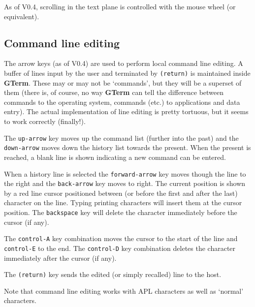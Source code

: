 \documentclass[a4paper,twoside,11pt]{article}
\newcommand{\newpara}{\par\vspace{4mm}\noindent}
\begin{document}
\newpara
As of V0.4, scrolling in the text plane is controlled with the mouse wheel (or equivalent). 

\subsection{Command line editing}
The arrow keys (as of V0.4) are used to perform local command line editing. A buffer of lines input by the user
and terminated by \texttt{(return)} is maintained inside \textbf{GTerm}. These may or may not be `commands', but they will be
a superset of them (there is, of course, no way \textbf{GTerm} can tell the difference between commands to the operating system,
commands (etc.) to applications and data entry). The actual implementation of line editing is pretty tortuous, but it 
seems to work correctly (finally!).

\newpara
The \texttt{up-arrow} key moves up the command list (further into the past) and the \texttt{down-arrow} moves down
the history list towards the present. When the present is reached, a blank line is shown indicating a new command can be
entered.

\newpara
When a history line is selected the \texttt{forward-arrow} key moves though the line to the right and the
\texttt{back-arrow} key moves to right. The current position is shown by a red line cursor positioned between
(or before the first and after the last) character on the line. Typing printing characters will insert them at the
cursor position. The \texttt{backspace} key will delete the character immediately before the cursor (if any).

\newpara
The \texttt{control-A} key combination moves the cursor to the start of the line and \texttt{control-E} to the end.
The \texttt{control-D} key combination deletes the character immediately after the cursor (if any).

\newpara
The \texttt{(return)} key sends the edited (or simply recalled) line to the host.

\newpara
Note that command line editing works with APL characters as well as `normal' characters.
\end{document}
